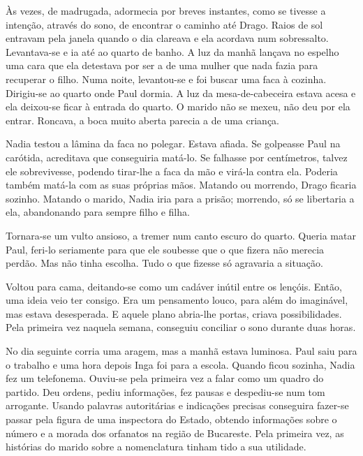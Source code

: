 Às vezes, de madrugada, adormecia por breves instantes, como se
tivesse a intenção, através do sono, de encontrar o caminho até Drago.
Raios de sol entravam pela janela quando o dia clareava e ela acordava
num sobressalto. Levantava-se e ia até ao quarto de banho. A luz da
manhã lançava no espelho uma cara que ela detestava por ser a de uma
mulher que nada fazia para recuperar o filho. Numa noite, levantou-se e
foi buscar uma faca à cozinha. Dirigiu-se ao quarto onde Paul dormia.
A luz da mesa-de-cabeceira estava acesa e ela deixou-se ficar à entrada
do quarto. O marido não se mexeu, não deu por ela entrar. Roncava, a
boca muito aberta parecia a de uma criança.

Nadia testou a lâmina da faca no polegar. Estava afiada. Se golpeasse
Paul na carótida, acreditava que conseguiria matá-lo. Se falhasse por
centímetros, talvez ele sobrevivesse, podendo tirar-lhe a faca da mão
e virá-la contra ela. Poderia também matá-la com as suas próprias mãos.
Matando ou morrendo, Drago ficaria sozinho. Matando o marido, Nadia iria
para a prisão; morrendo, só se libertaria a ela, abandonando para
sempre filho e filha.

Tornara-se um vulto ansioso, a tremer num canto escuro do quarto. Queria
matar Paul, feri-lo seriamente para que ele soubesse que o que fizera
não merecia perdão. Mas não tinha escolha. Tudo o que fizesse só
agravaria a situação.

Voltou para cama, deitando-se como um cadáver inútil entre os lençóis.
Então, uma ideia veio ter consigo. Era um pensamento louco, para além do
imaginável, mas estava desesperada. E aquele plano abria-lhe portas,
criava possibilidades. Pela primeira vez naquela semana, conseguiu conciliar o sono
durante duas horas.

No dia seguinte corria uma aragem, mas a manhã estava luminosa. Paul
saiu para o trabalho e uma hora depois Inga foi para a escola. Quando
ficou sozinha, Nadia fez um telefonema. Ouviu-se pela primeira vez a
falar como um quadro do partido. Deu ordens, pediu informações, fez
pausas e despediu-se num tom arrogante. Usando palavras autoritárias e
indicações precisas conseguira fazer-se passar pela figura de uma
inspectora do Estado, obtendo informações sobre o número e a morada dos
orfanatos na região de Bucareste. Pela primeira vez, as histórias do
marido sobre a nomenclatura tinham tido a sua utilidade.

